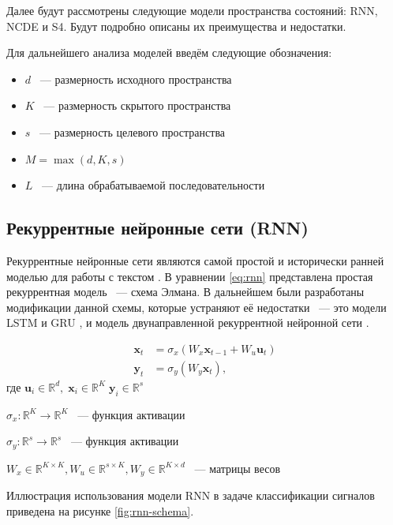 \documentclass[a4paper, 12pt]{article}
\newcommand{\bx}{\mathbf{x}}
\newcommand{\by}{\mathbf{y}}
\newcommand{\bu}{\mathbf{u}}
\newcommand{\dR}{\mathds{R}}
\begin{document}
	Далее будут рассмотрены следующие модели пространства состояний: RNN, NCDE и S4.
	Будут подробно описаны их преимущества и недостатки.
	
	Для дальнейшего анализа моделей введём следующие обозначения:
	\begin{itemize}
		\item[] $d$ ~--- размерность исходного пространства
		\item[] $K$ ~--- размерность скрытого пространства
		\item[] $s$ ~--- размерность целевого пространства
		\item[] $M = \max(d, K, s)$
		\item[] $L$ ~--- длина обрабатываемой последовательности
	\end{itemize}
	
	\subsection{Рекуррентные нейронные сети (RNN)}
	Рекуррентные нейронные сети являются самой простой и исторически ранней моделью для работы с текстом \citep{rnn}.
	В уравнении \ref{eq:rnn} представлена простая рекуррентная модель ~--- схема Элмана.
	В дальнейшем были разработаны модификации данной схемы, которые устраняют её недостатки ~--- это модели LSTM и GRU \citep{lstm, lstm-and-gru}, и модель двунаправленной рекуррентной нейронной сети \citep{bidirectional-rnn}.
	
	\begin{equation}\label{eq:rnn}
		\begin{aligned}
			\bx_t &= \sigma_x(W_x \bx_{t-1} + W_u \bu_t) \\
			\by_t &= \sigma_y(W_y \bx_t),
		\end{aligned}
	\end{equation}
	$\text{где } \bu_i \in \dR^d, \; \bx_i \in \dR^K \; \by_i \in \dR^s$  
	
	$\sigma_x: \dR^K \rightarrow \dR^K$ ~--- функция активации  
	
	$\sigma_y: \dR^s \rightarrow \dR^s$ ~--- функция активации  
	
	$W_x \in \dR^{K \times K}, W_u \in \dR^{s \times K}, W_y \in \dR^{K \times d}$ ~--- матрицы весов
	
	Иллюстрация использования модели RNN в задаче классификации сигналов приведена на рисунке \ref{fig:rnn-schema}.
	
\end{document}
